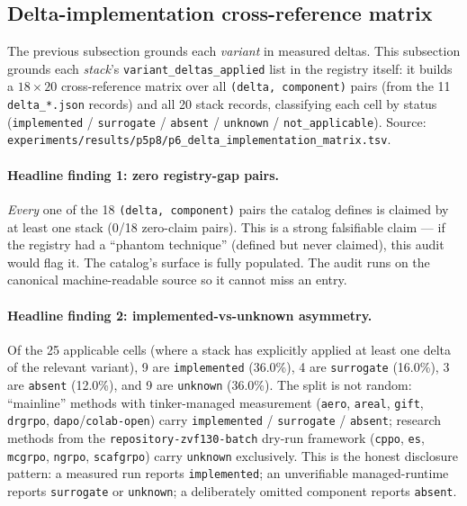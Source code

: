 \subsection{Delta-implementation cross-reference matrix}
\label{sec:p6-delta-implementation-matrix}

The previous subsection grounds each \emph{variant} in measured deltas.
This subsection grounds each \emph{stack}'s \texttt{variant\_deltas\_applied}
list in the registry itself: it builds a $18 \times 20$ cross-reference
matrix over all \texttt{(delta, component)} pairs (from the 11
\texttt{delta\_*.json} records) and all 20 stack records, classifying
each cell by status (\texttt{implemented} / \texttt{surrogate} /
\texttt{absent} / \texttt{unknown} / \texttt{not\_applicable}). Source:
\texttt{experiments/results/p5p8/p6\_delta\_implementation\_matrix.tsv}.

\paragraph{Headline finding 1: zero registry-gap pairs.}
\emph{Every} one of the 18 \texttt{(delta, component)} pairs the
catalog defines is claimed by at least one stack (0/18 zero-claim
pairs). This is a strong falsifiable claim --- if the registry had a
``phantom technique'' (defined but never claimed), this audit would
flag it. The catalog's surface is fully populated. The audit runs
on the canonical machine-readable source so it cannot miss an entry.

\paragraph{Headline finding 2: implemented-vs-unknown asymmetry.}
Of the 25 applicable cells (where a stack has explicitly applied at
least one delta of the relevant variant), 9 are \texttt{implemented}
(36.0\%), 4 are \texttt{surrogate} (16.0\%), 3 are \texttt{absent}
(12.0\%), and 9 are \texttt{unknown} (36.0\%). The split is not
random: ``mainline'' methods with tinker-managed measurement
(\texttt{aero}, \texttt{areal}, \texttt{gift}, \texttt{drgrpo},
\texttt{dapo}/\texttt{colab-open}) carry \texttt{implemented} /
\texttt{surrogate} / \texttt{absent}; research methods from the
\texttt{repository-zvf130-batch} dry-run framework
(\texttt{cppo}, \texttt{es}, \texttt{mcgrpo}, \texttt{ngrpo},
\texttt{scafgrpo}) carry \texttt{unknown} exclusively. This is the
honest disclosure pattern: a measured run reports
\texttt{implemented}; an unverifiable managed-runtime reports
\texttt{surrogate} or \texttt{unknown}; a deliberately omitted
component reports \texttt{absent}.

